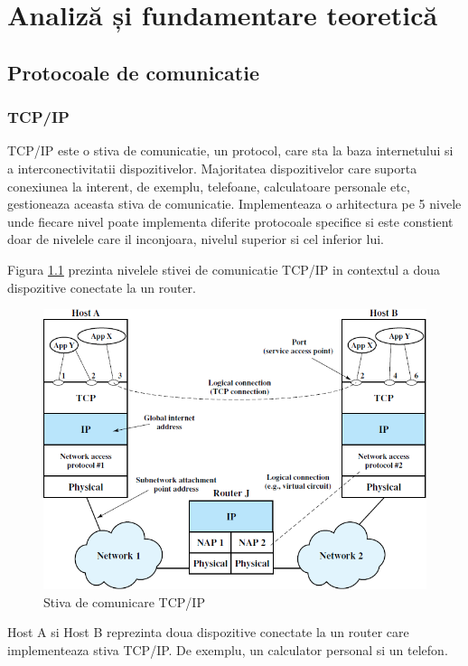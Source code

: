 \chapter{Analiză și fundamentare teoretică}
\label{ch:analysis}
\pagestyle{fancy}

\section{Protocoale de comunicatie}\label{sec:protocols}
\subsection{TCP/IP}\label{subsec:tcpip}
TCP/IP este o stiva de comunicatie, un protocol, care sta la baza internetului si a interconectivitatii dispozitivelor. Majoritatea dispozitivelor 
care suporta conexiunea la interent, de exemplu, telefoane, calculatoare personale etc, gestioneaza aceasta stiva de comunicatie. Implementeaza o arhitectura 
pe 5 nivele unde fiecare nivel poate implementa diferite protocoale specifice si este constient doar de nivelele care il inconjoara, nivelul superior 
si cel inferior lui. 

Figura \ref{fig:TCPIP_Layers} prezinta nivelele stivei de comunicatie TCP/IP in contextul a doua dispozitive conectate la un router.
\begin{figure}[H]
    \centering
    \includegraphics[scale=0.8]{figs/TCPIP_Layers.png}
    \caption{Stiva de comunicare TCP/IP \cite{williamStallings}}
    \label{fig:TCPIP_Layers}
\end{figure}

Host A si Host B reprezinta doua dispozitive conectate la un router care implementeaza stiva TCP/IP. De exemplu, un calculator personal si un telefon.

